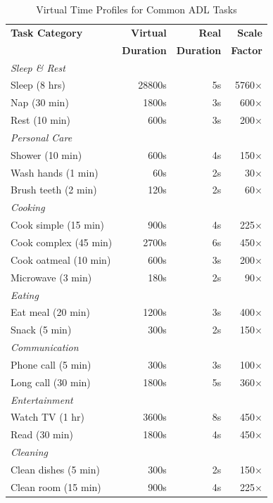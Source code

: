 \begin{table}[t]
\centering
\caption{Virtual Time Profiles for Common ADL Tasks}
\label{tab:time_profiles}
\begin{tabular}{@{}lrrr@{}}
\toprule
\textbf{Task Category} & \textbf{Virtual} & \textbf{Real} & \textbf{Scale} \\
& \textbf{Duration} & \textbf{Duration} & \textbf{Factor} \\
\midrule
\multicolumn{4}{l}{\textit{Sleep \& Rest}} \\
Sleep (8 hrs) & 28800s & 5s & 5760$\times$ \\
Nap (30 min) & 1800s & 3s & 600$\times$ \\
Rest (10 min) & 600s & 3s & 200$\times$ \\
\midrule
\multicolumn{4}{l}{\textit{Personal Care}} \\
Shower (10 min) & 600s & 4s & 150$\times$ \\
Wash hands (1 min) & 60s & 2s & 30$\times$ \\
Brush teeth (2 min) & 120s & 2s & 60$\times$ \\
\midrule
\multicolumn{4}{l}{\textit{Cooking}} \\
Cook simple (15 min) & 900s & 4s & 225$\times$ \\
Cook complex (45 min) & 2700s & 6s & 450$\times$ \\
Cook oatmeal (10 min) & 600s & 3s & 200$\times$ \\
Microwave (3 min) & 180s & 2s & 90$\times$ \\
\midrule
\multicolumn{4}{l}{\textit{Eating}} \\
Eat meal (20 min) & 1200s & 3s & 400$\times$ \\
Snack (5 min) & 300s & 2s & 150$\times$ \\
\midrule
\multicolumn{4}{l}{\textit{Communication}} \\
Phone call (5 min) & 300s & 3s & 100$\times$ \\
Long call (30 min) & 1800s & 5s & 360$\times$ \\
\midrule
\multicolumn{4}{l}{\textit{Entertainment}} \\
Watch TV (1 hr) & 3600s & 8s & 450$\times$ \\
Read (30 min) & 1800s & 4s & 450$\times$ \\
\midrule
\multicolumn{4}{l}{\textit{Cleaning}} \\
Clean dishes (5 min) & 300s & 2s & 150$\times$ \\
Clean room (15 min) & 900s & 4s & 225$\times$ \\
\bottomrule
\end{tabular}
\end{table}


